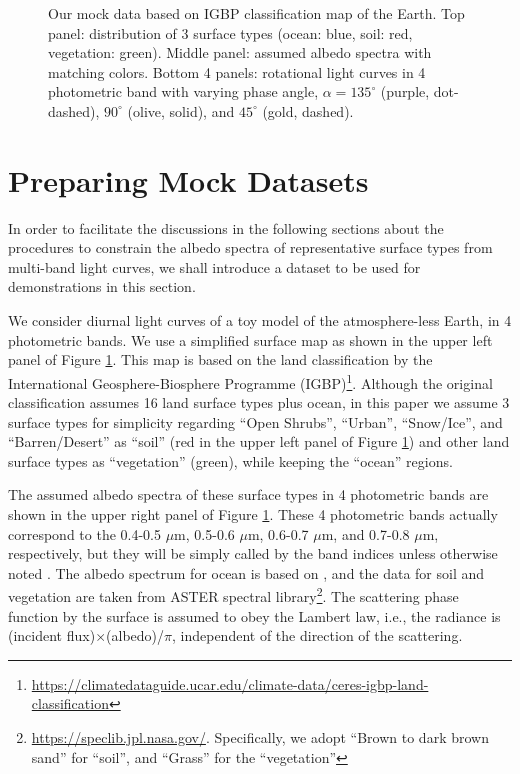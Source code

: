 \documentclass[iop,numberedappendix,apj,]{emulateapj}
\begin{document}
\begin{figure}[t]
\begin{center}
    \end{center}
    \caption{Our mock data based on IGBP classification map of the Earth. Top panel: distribution of 3 surface types (ocean: blue, soil: red, vegetation: green). Middle panel: assumed albedo spectra with matching colors. Bottom 4 panels: rotational light curves in 4 photometric band with varying phase angle, $\alpha = 135^{\circ }$ (purple, dot-dashed), $90^{\circ }$ (olive, solid), and $45^{\circ }$ (gold, dashed). }
\label{fig:mockdata}
\end{figure}


\section{Preparing Mock Datasets}
\label{s:mockdata}

In order to facilitate the discussions in the following sections about the procedures to constrain the albedo spectra of representative surface types from multi-band light curves, we shall introduce a dataset to be used for demonstrations in this section. 

We consider diurnal light curves of a toy model of the atmosphere-less Earth, in 4 photometric bands. 
We use a simplified surface map as shown in the upper left panel of Figure \ref{fig:mockdata}. 
This map is based on the land classification by the International Geosphere-Biosphere Programme (IGBP)\footnote{\url{https://climatedataguide.ucar.edu/climate-data/ceres-igbp-land-classification}}. 
Although the original classification assumes 16 land surface types plus ocean, in this paper we assume 3 surface types for simplicity regarding ``Open Shrubs'', ``Urban'', ``Snow/Ice'', and ``Barren/Desert'' as ``soil'' (red in the upper left panel of Figure \ref{fig:mockdata}) and other land surface types as ``vegetation'' (green), while keeping the ``ocean'' regions. 


The assumed albedo spectra of these surface types in 4 photometric bands are shown in the upper right panel of Figure \ref{fig:mockdata}. 
These 4 photometric bands actually correspond to the 0.4-0.5 $\mu $m, 0.5-0.6 $\mu $m, 0.6-0.7 $\mu $m, and 0.7-0.8 $\mu $m, respectively, but they will be simply called by the band indices unless otherwise noted . 
The albedo spectrum for ocean is based on \citet{Mclinden1997}, 
and the data for soil and vegetation are taken from ASTER spectral library\footnote{\url{https://speclib.jpl.nasa.gov/}. 
Specifically, we adopt  ``Brown to dark brown sand'' for ``soil'', and ``Grass'' for the ``vegetation''}. 
The scattering phase function by the surface is assumed to obey the Lambert law, i.e., the radiance is (incident flux)$\times $(albedo)/$\pi$, independent of the direction of the scattering. 
\end{document}
